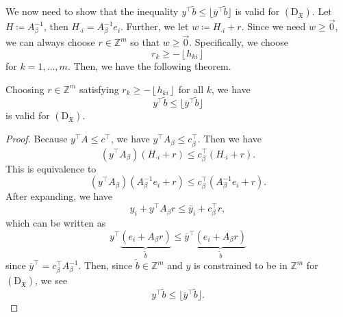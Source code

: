 We now need to show that the inequality \(y^{\top}\widetilde{b}\leq \lfloor \overline{y}^{\top}\widetilde{b} \rfloor\) is valid for \((\mathrm{D}_{\mathfrak{X}})\). Let \(H\coloneqq A^{-1}_{\beta}\), then \(H_{\cdot i} = A^{-1}_{\beta}e_{i}\). Further, we let \(w\coloneqq H_{\cdot i}+r\). Since we need \(w\geq \vec{0}\), we can always choose \(r\in \mathbb{Z}^m\) so that \(w\geq \vec{0}\). Specifically, we choose
\[
	r_k \geq -\left\lfloor h_{ki} \right\rfloor
\]
for \(k = 1, \dots , m\). Then, we have the following theorem.

\begin{theorem}\label{thm:lec24-2}
	Choosing \(r\in\mathbb{Z} ^m\) satisfying \(r_k \geq - \left\lfloor h_{ki} \right\rfloor\) for all \(k\), we have
	\[
		y^{\top} \widetilde{b} \leq \lfloor \overline{y} ^{\top} \widetilde{b} \rfloor
	\]
	is valid for \((\mathrm{D}_{\mathfrak{X}})\).
\end{theorem}
\begin{proof}
	Because \(y^{\top}A\leq c^{\top}\), we have \(y^{\top}A_{\beta}\leq c_{\beta}^{\top}\). Then we have
	\[
		\left(y^{\top}A_{\beta}\right)\left(H_{\cdot i}+r\right) \leq c_{\beta}^{\top}\left(H_{\cdot i}+r\right).
	\]
	This is equivalence to
	\[
		\left(y^{\top}A_{\beta}\right)\left(A^{-1}_{\beta}e_{i}+r\right) \leq c_{\beta}^{\top}\left(A^{-1}_{\beta}e_{i}+r\right).
	\]
	After expanding, we have
	\[
		y_{i}+y^{\top}A_{\beta}r\leq \overline{y}_{i}+c_{\beta}^{\top}r,
	\]
	which can be written as
	\[
		y^{\top}\underbrace{\left(e_{i}+A_{\beta}r\right)}_{\widetilde{b} } \leq \overline{y}^{\top} \underbrace{\left(e_{i}+A_{\beta}r\right)}_{\widetilde{b}}
	\]
	since \(\overline{y}^{\top} = c_{\beta}^{\top}A^{-1}_{\beta}\). Then, since \(\widetilde{b} \in \mathbb{Z} ^m\) and \(y\) is constrained to be
	in \(\mathbb{Z} ^m\) for \((\mathrm{D}_{\mathfrak{X}})\), we see
	\[
		y^{\top}\widetilde{b}\leq \lfloor \overline{y}^{\top}\widetilde{b} \rfloor.
	\]
\end{proof}

